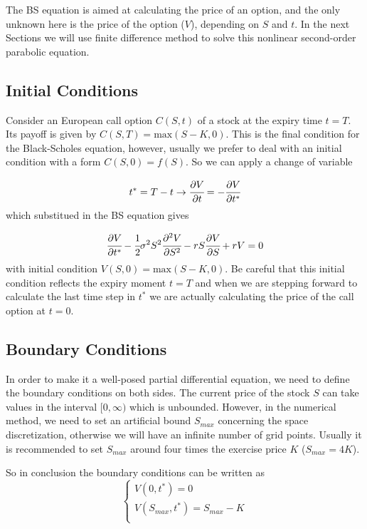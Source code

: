 The BS equation is aimed at calculating the price of an option, and the only unknown here is the price of the option ($V$), depending on $S$ and $t$. In the next Sections we will use finite difference method to solve this nonlinear second-order parabolic equation.

\subsection{Initial Conditions}
Consider an European call option $C(S, t)$ of a stock at the expiry time $t=T$. Its payoff is given by $C(S, T) = \textrm{max}(S-K, 0)$. This is the final condition for the Black-Scholes equation, however, usually we prefer to deal with an initial condition with a form  $C(S,0)=f(S)$. So we can apply a change of variable

\begin{equation}
t^* = T - t \rightarrow \cfrac{\partial V}{\partial t} = -\cfrac{\partial V}{\partial t^*} 
\end{equation}
which substitued in the BS equation gives

\begin{equation}
\cfrac{\partial V}{\partial t^*} - \cfrac{1}{2} \sigma^2 S^2 \cfrac{\partial^2 V}{\partial S^2} - rS \cfrac{\partial V}{\partial S} + rV = 0
\end{equation}
with initial condition $V(S,0)=\textrm{max}(S-K, 0)$. Be careful that this initial condition reflects the expiry moment $t=T$ and when we are stepping forward to calculate the last time step in $t^*$ we are actually calculating the price of the call option at $t=0$.

\subsection{Boundary Conditions}
In order to make it a well-posed partial differential equation, we need to define the boundary conditions on both sides. The current price of the stock $S$ can take values in the interval $[0, \infty)$ which is unbounded. However, in the numerical method, we need to set an artificial bound $S_{max}$ concerning the space discretization, otherwise we will have an infinite number of grid points. Usually it is recommended to set $S_{max}$ around four times the exercise price $K$ ($S_{max} = 4K$).

So in conclusion the boundary conditions can be written as
\begin{equation}
\begin{cases}
V(0, t^*) = 0 \\
V(S_{max}, t^*) = S_{max} - K \\
\end{cases}
\end{equation}

